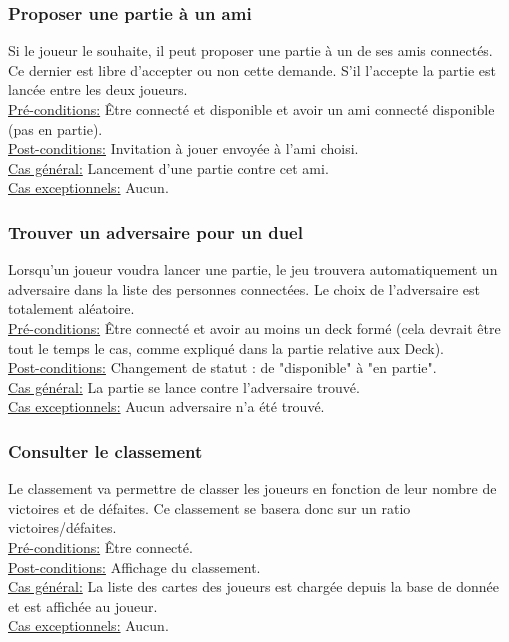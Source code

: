 \documentclass[11pt,a4paper]{article}
\begin{document}
\subsubsection*{Proposer une partie à un ami}

Si le joueur le souhaite, il peut proposer une partie à un de ses
amis connectés. Ce dernier est libre d'accepter ou non cette demande.
S'il l'accepte la partie est lancée entre les deux joueurs.\\
\underline{Pré-conditions:} 
 Être connecté et disponible et avoir un ami connecté disponible (pas en partie).\\
\underline{Post-conditions:} 
 Invitation à jouer envoyée à l'ami choisi.\\
\underline{Cas général:} 
 Lancement d'une partie contre cet ami.\\
\underline{Cas exceptionnels:} 
 Aucun.\\
 

\subsubsection*{Trouver un adversaire pour un duel}

Lorsqu'un joueur voudra lancer une partie, le jeu trouvera
automatiquement un adversaire dans la liste des personnes
connectées. Le choix de l'adversaire est totalement aléatoire.\\
\underline{Pré-conditions:} 
 Être connecté et avoir au moins un deck formé (cela devrait être tout le temps le cas, comme expliqué dans la partie relative aux Deck).\\
\underline{Post-conditions:} 
 Changement de statut : de "disponible" à "en partie".\\
\underline{Cas général:} 
 La partie se lance contre l'adversaire trouvé.\\
\underline{Cas exceptionnels:} 
 Aucun adversaire n'a été trouvé.\\

\subsubsection*{Consulter le classement}

Le classement va permettre de classer les joueurs en fonction de
leur nombre de victoires et de défaites. Ce classement se
basera donc sur un ratio victoires/défaites.\\
\underline{Pré-conditions:} 
 Être connecté.\\
\underline{Post-conditions:} 
 Affichage du classement.\\
\underline{Cas général:} 
 La liste des cartes des joueurs est chargée depuis la base de donnée et est affichée au joueur.\\
\underline{Cas exceptionnels:} 
 Aucun.\\
\end{document}
